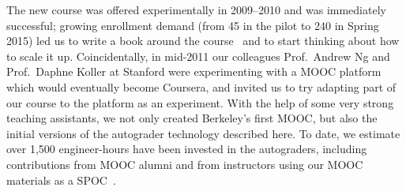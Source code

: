 The new course was offered experimentally in 2009--2010 and was
immediately successful; growing enrollment demand (from 45 in the pilot
to 240 in Spring 2015) led 
us to write a book around the course~\cite{esaaS} and to start thinking
about how to scale it up.  
Coincidentally, in mid-2011 our colleagues Prof.~Andrew Ng
and Prof.~Daphne Koller at Stanford were experimenting with a MOOC
platform which would eventually become Coursera, and invited us to try
adapting part of our course to the
platform as an experiment.  With the help of some very strong teaching
assistants, we not only created Berkeley's first MOOC, but also the
initial versions of the autograder technology described here.  To date,
we estimate over 1,500 engineer-hours have been invested in the
autograders, including contributions from MOOC alumni and from
instructors using our MOOC materials as a SPOC~\cite{moocs-spocs-TR}.


